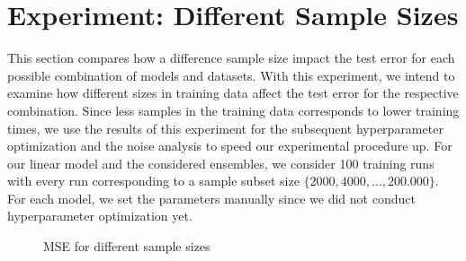 \section{Experiment: Different Sample Sizes}\label{sec:samplesize}

This section compares how a difference sample size impact the test error for each possible combination of models and datasets. With this experiment, we intend to examine how different sizes in training data affect the test error for the respective combination. Since less samples in the training data corresponds to lower training times, we use the results of this experiment for the subsequent hyperparameter optimization and the noise analysis to speed our experimental procedure up. For our linear model and the considered ensembles, we consider 100 training runs with every run corresponding to a sample subset size $ \{2000, 4000, \dots, 200.000\} $. For each model, we set the parameters manually since we did not conduct hyperparameter optimization yet. 

\begin{figure}[h]
	\centering
	\caption{MSE for different sample sizes}
	\label{fig:prepdelay}
\end{figure}


